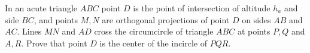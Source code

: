 In an acute triangle $ABC$ point $D$ is the point of intersection of altitude $h_a$ and side $BC$, and points $M, N$ are orthogonal projections of point $D$ on sides $AB$ and $AC$. Lines $MN$ and $AD$ cross the circumcircle of triangle $ABC$ at points $P, Q$ and $A, R$. Prove that point $D$ is the center of the incircle of $PQR$.